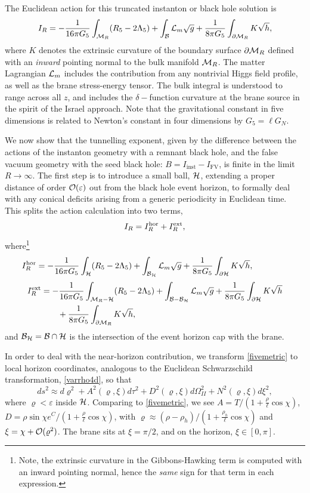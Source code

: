\documentclass[aps,12pt,prd,superscriptaddress,preprintnumbers, 
	amssymb,
	amsmath,
	notitlepage,
	longbibliography,
	nofootinbib]{revtex4-1}
\newcommand{\be}{\begin{equation}}
\newcommand{\ee}{\end{equation}}
\newcommand{\beal}{\begin{aligned}}
\newcommand{\eeal}{\end{aligned}}
\begin{document}
The Euclidean action for this truncated instanton or black hole
solution is
\begin{equation}
I_R=-\frac{1}{16\pi G_5}\int_{{\cal M}_R}(R_5-2\Lambda_5)
+\int_{{\cal B}}{\cal L}_m\sqrt{g}
+\frac{1}{8\pi G_5}\int_{{\partial\cal M}_R} K\sqrt{h},
\end{equation}
where $K$ denotes the extrinsic curvature of the boundary surface
$\partial {\cal M}_R$ defined with an \emph{inward} pointing normal
to the bulk manifold ${\cal M}_R$. The matter Lagrangian ${\cal L}_m$ includes
the contribution from any nontrivial Higgs field profile, as well as
the brane stress-energy tensor. The bulk integral is understood to 
range across all $z$, and includes the $\delta-$function curvature
at the brane source in the spirit of the Israel approach.
Note that the gravitational constant in five dimensions is related to 
Newton's constant in four dimensions by $G_5=\ell G_N$.

We now show that the tunnelling exponent, given by the difference
between the actions of the instanton geometry with a remnant black
hole, and the false vacuum geometry with the seed black hole:
$B=I_{\text{inst}}-I_{\text{FV}}$, is finite in the limit $R\to\infty$. 
The first step is to introduce a small ball, ${\cal H}$, extending a 
proper distance of order ${\cal O}(\varepsilon)$ out from the black 
hole event horizon, to formally deal with any conical deficits arising 
from a generic periodicity in Euclidean time. This splits the action 
calculation into two terms,
\begin{equation}
I_R=I_{R}^{\rm hor}+I_{R}^{\rm ext},
\end{equation}
where\footnote{Note, the extrinsic curvature in the Gibbons-Hawking term 
is computed with an inward pointing normal, hence the \emph{same} sign
for that term in each expression.}
\be
I_R^{\rm hor}=-\frac{1}{16\pi G_5}\int_{\cal H}(R_5-2\Lambda_5)+
\int_{{\cal B}_{\cal H}}{\cal L}_m\sqrt{g} +
\frac{1}{8\pi G_5}\int_{\partial\cal H} K\sqrt{h},\hskip 15mm
\ee
\be
\beal
I_R^{\rm ext}&=-\frac{1}{16\pi G_5}\int_{{\cal M}_R-{\cal H}}(R_5-2\Lambda_5)+
\int_{{\cal B}-{\cal B}_{\cal H}}{\cal L}_m\sqrt{g}
+\frac{1}{8\pi G_5}\int_{\partial\cal H} K\sqrt{h}\\
&\qquad+\frac{1}{8\pi G_5}\int_{{\partial\cal M}_R} K\sqrt{h},
\eeal
\label{ir}
\ee
and ${\cal B}_{\cal H}= {\cal B}\cap{\cal H}$ is the intersection of the 
event horizon cap with the brane.

In order to deal with the near-horizon contribution, we transform 
\eqref{fivemetric} to local horizon coordinates,
analogous to the Euclidean Schwarzschild transformation, 
\eqref{varrho4d}, so that
\begin{equation}
ds^2\approx d\varrho^2+A^2(\varrho,\xi)d\tau^2
+D^2(\varrho,\xi) d\Omega^2_{I\!I}+N^2(\varrho,\xi)d\xi^2,
\label{nearhor}
\end{equation}
where $\varrho<\varepsilon$ inside ${\cal H}$.
Comparing to \eqref{fivemetric}, we see $A = T/(1+\frac\rho\ell\cos\chi)$,
$D = \rho \sin\chi e^C/(1+\frac\rho\ell\cos\chi)$, with $\varrho \approx 
(\rho-\rho_h)/(1+\frac{\rho_h}\ell\cos\chi)$
and $\xi = \chi + {\cal O}(\varrho^2)$. The brane sits at $\xi=\pi/2$,
and on the horizon, $\xi\in[0,\pi]$.
\end{document}
